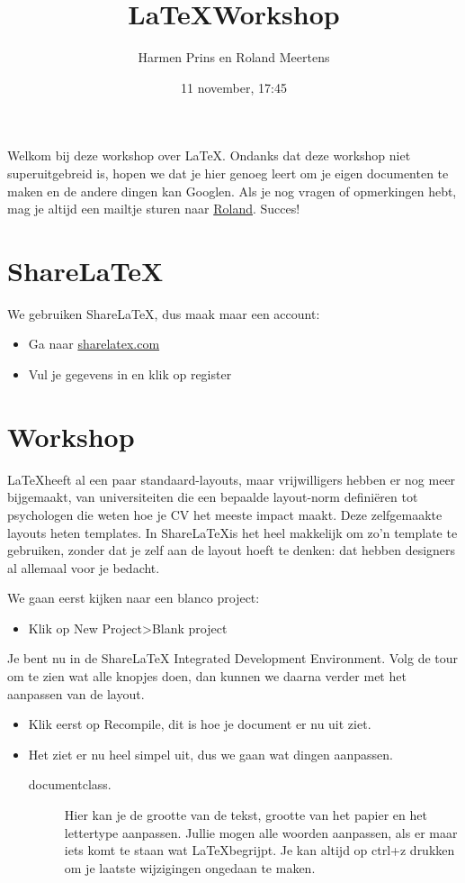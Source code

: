 \documentclass[a4paper,10pt]{article}
\title{\LaTeX Workshop}
\date{11 november, 17:45}
\author{Harmen Prins en Roland Meertens}
\begin{document}
\maketitle

Welkom bij deze workshop over \LaTeX. Ondanks dat deze workshop niet superuitgebreid is, hopen we dat je hier genoeg leert om je eigen documenten te maken en de andere dingen kan Googlen. Als je nog vragen of opmerkingen hebt, mag je altijd een mailtje sturen naar   \href{mailto:rolandmeertens@gmail.com}{Roland}. Succes!

\section{Share\LaTeX}
We gebruiken Share\LaTeX, dus maak maar een account:
\begin{itemize}
\item Ga naar \href{http://www.sharelatex.com}{sharelatex.com}
\item Vul je gegevens in en klik op register
\end{itemize}

\section{Workshop}

\LaTeX heeft al een paar standaard-layouts, maar vrijwilligers hebben er nog meer bijgemaakt, van universiteiten die een bepaalde layout-norm definiëren tot psychologen die weten hoe je CV het meeste impact maakt. Deze zelfgemaakte layouts heten templates.
In Share\LaTeX is het heel makkelijk om zo'n template te gebruiken, zonder dat je zelf aan de layout hoeft te denken: dat hebben designers al allemaal voor je bedacht. 

 We gaan eerst kijken naar een blanco project: 
\begin{itemize}
\item Klik op New Project\textgreater Blank project
\end{itemize}


Je bent nu in de ShareLaTeX Integrated Development Environment. Volg de tour om te zien wat alle knopjes doen, dan kunnen we daarna verder met het aanpassen van de layout.
\begin{itemize}
\item Klik eerst op Recompile, dit is hoe je document er nu uit ziet.
\item Het ziet er nu heel simpel uit, dus we gaan wat dingen aanpassen. 
\begin{description}
\item[documentclass.] Hier kan je de grootte van de tekst, grootte van het papier en het lettertype aanpassen. Jullie mogen alle woorden aanpassen, als er maar iets komt te staan wat \LaTeX begrijpt. Je kan altijd op ctrl+z drukken om je laatste wijzigingen ongedaan te maken.
\end{description}
\end{itemize}
\end{document}
